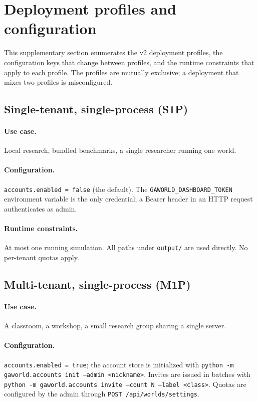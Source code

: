 \section{Deployment profiles and configuration}
\label{supp:deployment}

This supplementary section enumerates the v2 deployment profiles, the
configuration keys that change between profiles, and the runtime
constraints that apply to each profile.  The profiles are mutually
exclusive; a deployment that mixes two profiles is misconfigured.

\subsection{Single-tenant, single-process (S1P)}

\paragraph{Use case.}  Local research, bundled benchmarks, a single
researcher running one world.

\paragraph{Configuration.}
\texttt{accounts.enabled = false} (the default).  The
\texttt{GAWORLD\_DASHBOARD\_TOKEN} environment variable is the only
credential; a Bearer header in an HTTP request authenticates as admin.

\paragraph{Runtime constraints.}  At most one running simulation.
All paths under \texttt{output/} are used directly.  No per-tenant
quotas apply.

\subsection{Multi-tenant, single-process (M1P)}

\paragraph{Use case.}  A classroom, a workshop, a small research group
sharing a single server.

\paragraph{Configuration.}
\texttt{accounts.enabled = true}; the account store is initialized
with \texttt{python -m gaworld.accounts init --admin <nickname>}.
Invites are issued in batches with \texttt{python -m gaworld.accounts
invite --count N --label <class>}.  Quotas are configured by the
admin through \texttt{POST /api/worlds/settings}.

